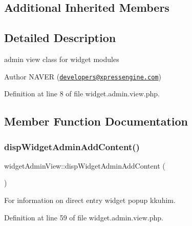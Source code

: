 \subsection*{Additional Inherited Members}


\subsection{Detailed Description}
admin view class for widget modules 

\begin{DoxyAuthor}{Author}
N\+A\+V\+ER (\href{mailto:developers@xpressengine.com}{\tt developers@xpressengine.\+com}) 
\end{DoxyAuthor}


Definition at line 8 of file widget.\+admin.\+view.\+php.



\subsection{Member Function Documentation}
\mbox{\label{classwidgetAdminView_a2f499c5195c994d427e80b9e3cbaa7ef}} 
\subsubsection{\texorpdfstring{disp\+Widget\+Admin\+Add\+Content()}{dispWidgetAdminAddContent()}}
{\footnotesize\ttfamily widget\+Admin\+View\+::disp\+Widget\+Admin\+Add\+Content (\begin{DoxyParamCaption}{ }\end{DoxyParamCaption})}



For information on direct entry widget popup kkuhim. 



Definition at line 59 of file widget.\+admin.\+view.\+php.

\mbox{\label{classwidgetAdminView_ad5defcecf21fb470cb6c3b2e868941a0}} 
